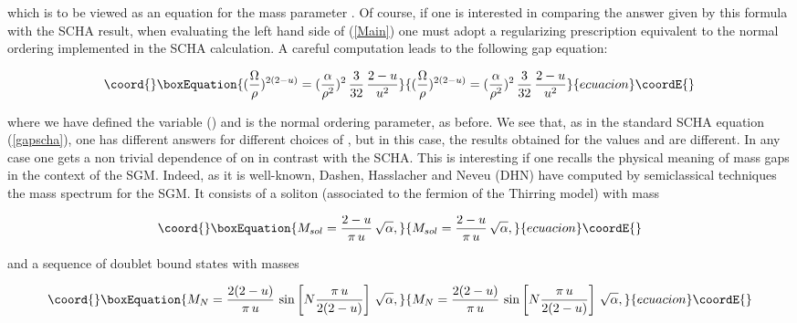 \documentclass[a4paper,12pt]{article}
\begin{document}
\noindent which is to be viewed as an equation for the mass parameter \myHighlight{$\Omega$}\coordHE{}. Of
course, if one is interested in comparing the answer given by this formula with the
SCHA result, when evaluating the left hand side of (\ref{Main}) one must adopt a
regularizing prescription equivalent to the normal ordering implemented in the SCHA
calculation. A careful computation leads to the following gap equation:

\begin{equation}\coord{}\boxEquation{\label{gapcga}
(\frac{\Omega}{\rho})^{2(2-u)}=(\frac{\alpha}{\rho^2})^2\,\frac{3}{32}\,\frac{2-u}{u^2}
}{(\frac{\Omega}{\rho})^{2(2-u)}=(\frac{\alpha}{\rho^2})^2\,\frac{3}{32}\,\frac{2-u}{u^2}
}{ecuacion}\coordE{}\end{equation}

\noindent where we have defined the variable \coordHE{}
(\coordHE{}) and \myHighlight{$\rho$}\coordHE{} is the normal ordering parameter, as
before. We see that, as in the standard SCHA equation
(\ref{gapscha}), one has different answers for different choices
of \myHighlight{$\rho$}\coordHE{}, but in this case, the results obtained for the values
\myHighlight{$\sqrt{\alpha}$}\coordHE{} and \myHighlight{$\Omega$}\coordHE{} are different. In any case one gets a
non trivial dependence of \myHighlight{$\Omega$}\coordHE{} on \coordHE{} in contrast with
the SCHA. This is interesting if one recalls the physical meaning
of mass gaps in the context of the SGM. Indeed, as it is
well-known, Dashen, Hasslacher and Neveu (DHN) \cite{DHN} have
computed by semiclassical techniques the mass spectrum for the
SGM. It consists of a soliton (associated to the fermion of the
Thirring model) with mass

\begin{equation}\coord{}\boxEquation{\label{soliton}
M_{sol}=\frac{2-u}{\pi\,u}\,\sqrt{\alpha},
}{M_{sol}=\frac{2-u}{\pi\,u}\,\sqrt{\alpha},
}{ecuacion}\coordE{}\end{equation}

\noindent and a sequence of doublet bound states with masses

\begin{equation}\coord{}\boxEquation{\label{doublets}
M_{N}=\frac{2(2-u)}{\pi\,u}\,\sin\left[N
\frac{\pi\,u}{2(2-u)}\right]\, \sqrt{\alpha},
}{M_{N}=\frac{2(2-u)}{\pi\,u}\,\sin\left[N
\frac{\pi\,u}{2(2-u)}\right]\, \sqrt{\alpha},
}{ecuacion}\coordE{}\end{equation}
\end{document}
